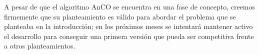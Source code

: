 \documentclass{llncs}
\begin{document}
A pesar de que el algoritmo AnCO se encuentra en una fase de concepto, creemos firmemente que su planteamiento es v{\'a}lido para abordar el problema que se planteaba en la introducci{\'o}n; en los pr{\'o}ximos meses se intentar{\'a} mantener activo el desarrollo para conseguir una primera versi{\'o}n que pueda ser competitiva frente a otros planteamientos.



%
%

\end{document}
